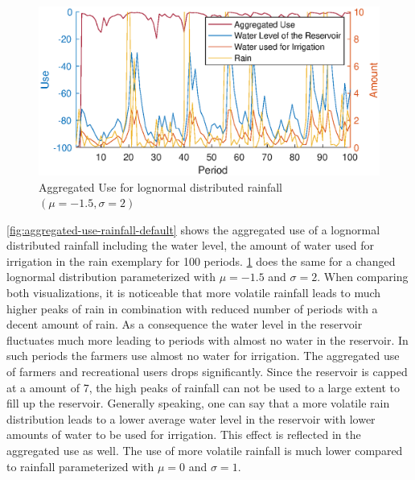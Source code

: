 \documentclass[12pt, a4paper, oneside]{article}
\begin{document}
\begin{figure}[ht]
\includegraphics[width=1\textwidth]{figures/aggregated-use-rainfall-more-volatile.eps}
\caption{Aggregated Use for lognormal distributed rainfall $(\mu=-1.5, \sigma=2)$}
\label{fig:aggregated-use-rainfall-more-volatile}
\end{figure}
\ref{fig:aggregated-use-rainfall-default} shows the aggregated use of a lognormal distributed rainfall including the water level, the amount of water used for irrigation in the rain exemplary for 100 periods. \ref{fig:aggregated-use-rainfall-more-volatile} does the same for a changed lognormal distribution parameterized with $\mu=-1.5$ and $\sigma=2$.
When comparing both visualizations, it is noticeable that more volatile rainfall leads to much higher peaks of rain in combination with reduced number of periods with a decent amount of rain. 
As a consequence the water level in the reservoir fluctuates much more leading to periods with almost no water in the reservoir. 
In such periods the farmers use almost no water for irrigation.
The aggregated use of farmers and recreational users drops significantly.
Since the reservoir is capped at a amount of 7, the high peaks of rainfall can not be used to a large extent to fill up the reservoir.
Generally speaking, one can say that a more volatile rain distribution leads to a lower average water level in the reservoir with lower amounts of water to be used for irrigation.
This effect is reflected in the aggregated use as well. 
The use of more volatile rainfall is much lower compared to rainfall parameterized with $\mu=0$ and $\sigma=1$.
\clearpage
\end{document}

